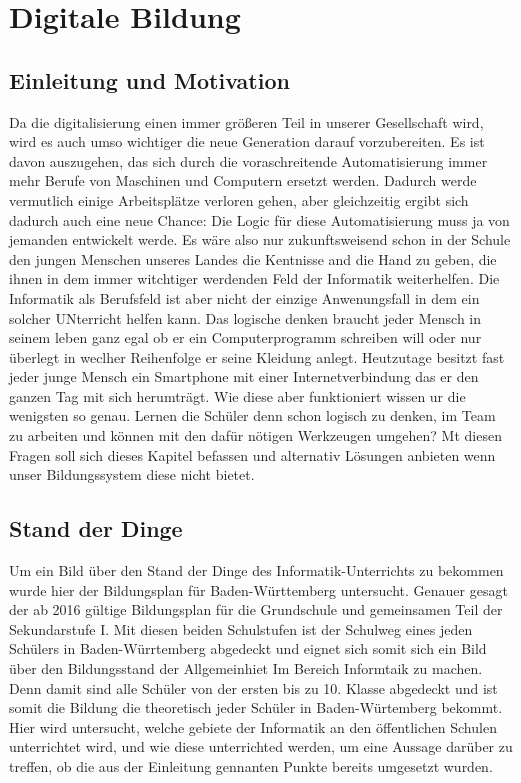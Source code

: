 \chapter{Digitale Bildung}

\section{Einleitung und Motivation}

Da die digitalisierung einen immer größeren Teil in unserer Gesellschaft wird, wird es auch umso wichtiger die neue Generation darauf vorzubereiten. Es ist davon auszugehen, das sich durch die voraschreitende Automatisierung immer mehr Berufe von Maschinen und Computern ersetzt werden. Dadurch werde vermutlich einige Arbeitsplätze verloren gehen, aber gleichzeitig ergibt sich dadurch auch eine neue Chance: Die Logic für diese Automatisierung muss ja von jemanden entwickelt werde. Es wäre also nur zukunftsweisend  schon in der Schule den jungen Menschen unseres Landes die Kentnisse and die Hand zu geben, die ihnen in dem immer witchtiger werdenden Feld der Informatik weiterhelfen.
Die Informatik als Berufsfeld ist aber nicht der einzige Anwenungsfall in dem ein solcher UNterricht helfen kann. Das logische denken braucht jeder Mensch in seinem leben ganz egal ob er ein Computerprogramm schreiben will oder nur überlegt in weclher Reihenfolge er seine Kleidung anlegt. Heutzutage besitzt fast jeder junge Mensch ein Smartphone mit einer Internetverbindung das er den ganzen Tag  mit sich herumträgt. Wie diese aber funktioniert wissen ur die wenigsten so genau. 
Lernen die Schüler denn schon logisch zu denken, im Team zu arbeiten und können mit den dafür nötigen Werkzeugen umgehen? Mt diesen Fragen soll sich dieses Kapitel befassen und alternativ Lösungen anbieten wenn unser Bildungssystem diese nicht bietet.


\section{Stand der Dinge}

Um ein Bild über den Stand der Dinge des Informatik-Unterrichts zu bekommen wurde hier der Bildungsplan für Baden-Württemberg untersucht. Genauer gesagt der ab 2016 gültige Bildungsplan für die Grundschule und gemeinsamen Teil der Sekundarstufe I. Mit diesen beiden Schulstufen ist der Schulweg eines jeden Schülers in Baden-Würrtemberg abgedeckt und eignet sich somit sich ein Bild über den Bildungsstand der Allgemeinhiet Im Bereich Informtaik zu machen. Denn damit sind alle Schüler von der ersten bis zu 10. Klasse abgedeckt und ist somit die Bildung die theoretisch jeder Schüler in Baden-Würtemberg bekommt. Hier wird untersucht, welche gebiete der Informatik an den öffentlichen Schulen unterrichtet wird, und wie diese unterrichted werden, um eine Aussage darüber zu treffen, ob die aus der Einleitung gennanten Punkte bereits umgesetzt wurden.

